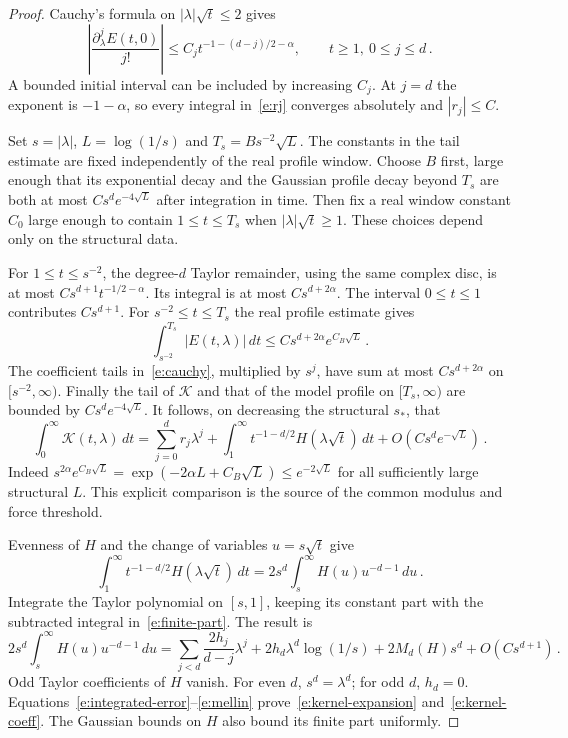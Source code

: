 \documentclass[11pt]{amsart}
\theoremstyle{definition}
\theoremstyle{remark}
\numberwithin{equation}{section}
\newcommand{\dd}{\,d}
\newcommand{\abs}[1]{\left|#1\right|}
\begin{document}
\begin{proof}
Cauchy's formula on $|\lambda|\sqrt t\leq2$ gives
\begin{equation}\label{e:cauchy}
 \abs{\frac{\partial_\lambda^jE(t,0)}{j!}}
 \leq C_j t^{-1-(d-j)/2-\alpha},\qquad t\geq1,\ 0\leq j\leq d\, .
\end{equation}
A bounded initial interval can be included by increasing $C_j$. At $j=d$ the exponent is $-1-\alpha$, so every integral in~\eqref{e:rj} converges absolutely and $|r_j|\leq C$.

Set $s=|\lambda|$, $L=\log(1/s)$ and $T_s=Bs^{-2}\sqrt L$. The constants in the tail estimate are fixed independently of the real profile window. Choose $B$ first, large enough that its exponential decay and the Gaussian profile decay beyond $T_s$ are both at most $Cs^de^{-4\sqrt L}$ after integration in time. Then fix a real window constant $C_0$ large enough to contain $1\leq t\leq T_s$ when $|\lambda|\sqrt t\geq1$. These choices depend only on the structural data.

For $1\leq t\leq s^{-2}$, the degree-$d$ Taylor remainder, using the same complex disc, is at most $Cs^{d+1}t^{-1/2-\alpha}$. Its integral is at most $Cs^{d+2\alpha}$. The interval $0\leq t\leq1$ contributes $Cs^{d+1}$. For $s^{-2}\leq t\leq T_s$ the real profile estimate gives
\begin{equation*}
 \int_{s^{-2}}^{T_s}|E(t,\lambda)|\dd t
 \leq Cs^{d+2\alpha}e^{C_B\sqrt L}\, .
\end{equation*}
The coefficient tails in~\eqref{e:cauchy}, multiplied by $s^j$, have sum at most $Cs^{d+2\alpha}$ on $[s^{-2},\infty)$. Finally the tail of $\mathcal K$ and that of the model profile on $[T_s,\infty)$ are bounded by $Cs^de^{-4\sqrt L}$. It follows, on decreasing the structural $s_*$, that
\begin{equation}\label{e:integrated-error}
 \int_0^\infty\mathcal K(t,\lambda)\dd t
 =\sum_{j=0}^dr_j\lambda^j
  +\int_1^\infty t^{-1-d/2}H(\lambda\sqrt t)\dd t
  +O(Cs^de^{-\sqrt L})\, .
\end{equation}
Indeed $s^{2\alpha}e^{C_B\sqrt L} =\exp(-2\alpha L+C_B\sqrt L)\leq e^{-2\sqrt L}$ for all sufficiently large structural $L$. This explicit comparison is the source of the common modulus and force threshold.

Evenness of $H$ and the change of variables $u=s\sqrt t$ give
\begin{equation*}
 \int_1^\infty t^{-1-d/2}H(\lambda\sqrt t)\dd t
 =2s^d\int_s^\infty H(u)u^{-d-1}\dd u\, .
\end{equation*}
Integrate the Taylor polynomial on $[s,1]$, keeping its constant part with the subtracted integral in~\eqref{e:finite-part}. The result is
\begin{equation}\label{e:mellin}
 2s^d\int_s^\infty H(u)u^{-d-1}\dd u
 =\sum_{j<d}\frac{2h_j}{d-j}\lambda^j
  +2h_d\lambda^d\log(1/s)+2M_d(H)s^d+O(Cs^{d+1})\, .
\end{equation}
Odd Taylor coefficients of $H$ vanish. For even $d$, $s^d=\lambda^d$; for odd $d$, $h_d=0$. Equations~\eqref{e:integrated-error}--\eqref{e:mellin} prove~\eqref{e:kernel-expansion} and~\eqref{e:kernel-coeff}. The Gaussian bounds on $H$ also bound its finite part uniformly.
\end{proof}
\end{document}

